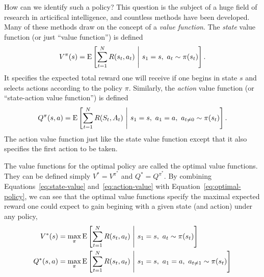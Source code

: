 How can we identify such a policy? This question is the subject of a huge field of research in articifical intelligence, and countless methods have been developed. Many of these methods draw on the concept of a \emph{value function}. The \emph{state} value function (or just ``value function'') is defined
%
\begin{equation}\label{eq:state-value}
  V^\pi(s) = \operatorname*{E} \left[ 
    \sum_{t=1}^{N} R(s_t, a_t)
   \ \middle\vert\ 
   s_1 = s,\ a_t \sim \pi(s_t)
   \right].
\end{equation}
%
It specifies the expected total reward one will receive if one begins in state $s$ and selects actions according to the policy $\pi$. Similarly, the \emph{action} value function (or ``state-action value function'') is defined
%
\begin{equation}\label{eq:action-value}
  Q^\pi(s, a) = \operatorname*{E} \left[ 
    \sum_{t=1}^{N} R(S_t, A_t)
   \ \middle\vert\ 
   s_1 = s,\ a_1 = a,\ a_{t \neq 0} \sim \pi(s_t)
   \right].
\end{equation}
%
The action value function just like the state value function except that it also specifies the first action to be taken. 

The value functions for the optimal policy are called the optimal value functions. They can be defined simply $V^* = V^{\pi^*}$ and $Q^* = Q^{\pi^*}$. By combining Equations~\ref{eq:state-value} and~\ref{eq:action-value} with Equation~\ref{eq:optimal-policy}, we can see that the optimal value functions specify the maximal expected reward one could expect to gain begining with a given state (and action) under any policy,
\begin{equation}
  \begin{aligned}
  V^*(s) &= \max_\pi \operatorname*{E} \left[ 
    \sum_{t=1}^{N} R(s_t, a_t)
   \ \middle\vert\ 
   s_1 = s,\ a_t \sim \pi(s_t)
   \right] \\
  Q^*(s, a) &= \max_\pi \operatorname*{E} \left[ 
    \sum_{t=1}^{N} R(s_t, a_t)
   \ \middle\vert\ 
   s_1 = s,\ a_1 = a,\ a_{t \neq 1} \sim \pi(s_t)
   \right]
  \end{aligned}
\end{equation}


